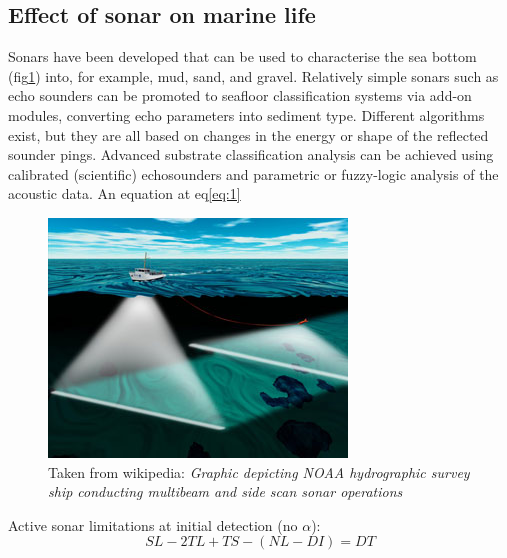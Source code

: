 \documentclass[twocolumn]{article}
\begin{document}
\subsection{Effect of sonar on marine life}
Sonars have been developed that can be used to characterise the sea bottom (fig\ref{fig:sample2}) into, for example, mud, sand, and gravel. Relatively simple sonars such as echo sounders can be promoted to seafloor classification systems via add-on modules, converting echo parameters into sediment type. Different algorithms exist, but they are all based on changes in the energy or shape of the reflected sounder pings. Advanced substrate classification analysis can be achieved using calibrated (scientific) echosounders and parametric or fuzzy-logic analysis of the acoustic data. An equation at eq\ref{eq:1}
\begin{figure}
\includegraphics[scale=0.4]{pics/seabedWikiPic}
\caption{\label{fig:sample2}Taken from wikipedia: \emph{Graphic depicting NOAA hydrographic survey ship conducting multibeam and side scan sonar operations}}
\end{figure}

Active sonar limitations at initial detection (no $\alpha$):
\begin{equation}
  \label{eq:1}
SL - 2TL + TS - (NL-DI) = DT
\end{equation}




 
\end{document}
